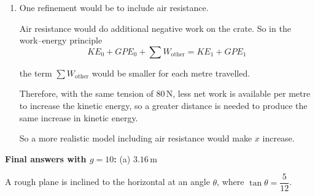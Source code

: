 \documentclass[leqno]{article}
\begin{document}
\begin{enumerate}[
  label=\textbf{\arabic*.},
  leftmargin=*,
  topsep=0pt,
  partopsep=0pt,
  parsep=0pt
]
\begin{djsSolution}
\begin{enumerate}[label=\textbf{(\alph*)}]
  The other forces doing work are the tension and friction, so \(\sum W_{\text{other}}=80x\cos 20^\circ-0.3Rx\). Substituting:
  \begin{align*}
  \frac12 \times 10 \times 1.5^2 + 80x\cos 20^\circ - 0.3Rx
  &= \frac12 \times 10 \times 4.5^2 + 98x\sin 15^\circ
  \end{align*}

  Rearranging:
  \begin{align*}
  80x\cos 20^\circ - 98x\sin 15^\circ - 0.3Rx
  &= \frac12 \times 10 \times (4.5^2-1.5^2) \\
  80x\cos 20^\circ - 98x\sin 15^\circ - 0.3(98\cos 15^\circ-80\sin 20^\circ)x
  &= 90
  \end{align*}

  Therefore
  \begin{align*}
  x &= \frac{90}{80\cos 20^\circ - 98\sin 15^\circ - 0.3(98\cos 15^\circ-80\sin 20^\circ)} \\
    &\approx 3.04
  \end{align*}

  Hence
  \[
  x \approx 3.04\,\mathrm{m}
  \]

  \item One refinement would be to include air resistance.

  Air resistance would do additional negative work on the crate. So in the work--energy principle
  \[
  KE_0+GPE_0+\sum W_{\text{other}}=KE_1+GPE_1
  \]

  the term $\sum W_{\text{other}}$ would be smaller for each metre travelled.

  Therefore, with the same tension of $80\,\mathrm{N}$, less net work is available per metre to increase the kinetic energy, so a greater distance is needed to produce the same increase in kinetic energy.

  So a more realistic model including air resistance would make $x$ increase.
\end{enumerate}
\par\medskip\noindent\textbf{Final answers with \(g = 10\):} (a) \(3.16\,\mathrm{m}\)
\end{djsSolution}


\newpage

\questionitem

A rough plane is inclined to the horizontal at an angle $\theta$, where $\tan\theta=\dfrac{5}{12}$. \\


\end{enumerate}
\end{document}
